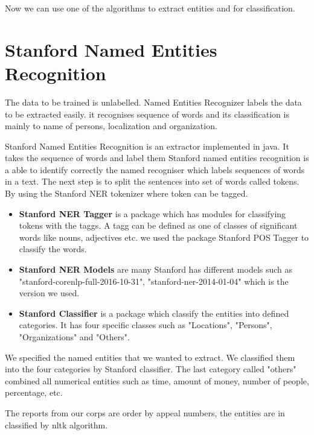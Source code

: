 Now  we can use  one of the algorithms to extract entities and for classification.

\section{Stanford Named Entities Recognition}

The data to be trained is unlabelled. Named Entities Recognizer labels the data to be extracted easily. it recognises sequence of words and its classification is mainly to name of persons, localization and organization.

Stanford Named Entities Recognition is an extractor implemented in java. It takes the sequence of words and label them 
Stanford named entities recognition is  a able to identify correctly the named recogniser which labels sequences of words in a text. The next step is to split the sentences into set of words called tokens. By using the Stanford NER tokenizer  where token can be tagged. 

\begin{itemize} 
\item \textbf{Stanford NER Tagger} is a package which has modules for classifying tokens with the taggs. A tagg can be defined as one of classes of significant words like nouns, adjectives etc. we used the package Stanford POS Tagger to classify the words. 
\item \textbf{Stanford NER Models} are many Stanford has different models such as "stanford-corenlp-full-2016-10-31", "stanford-ner-2014-01-04" which is the version we used. 

\item \textbf{Stanford Classifier} is a package which classify the entities into defined categories. It has four specific classes such as  "Locations",  "Persons",  "Organizations" and    "Others".
\end{itemize}

We specified the named entities that we wanted to extract. We classified them into the four categories by Stanford classifier.  The last category called "others" combined all numerical entities such as time, amount of money, number of people, percentage, etc. 

The reports from our corps are order by appeal numbers, the entities are in classified by nltk algorithm. 



